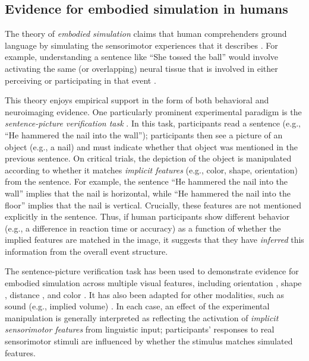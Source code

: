 \documentclass[11pt]{article}
\begin{document}
\subsection{Evidence for embodied simulation in humans}

The theory of \textit{embodied simulation} claims that human comprehenders ground language by simulating the sensorimotor experiences that it describes \cite{barsalou1999perceptual, harnad1990symbol}. For example, understanding a sentence like ``She tossed the ball'' would involve activating the same (or overlapping) neural tissue that is involved in either perceiving or participating in that event \cite{bergen2015embodiment}. 

This theory enjoys empirical support in the form of both behavioral \cite{zwaan2002language, pecher2009short, winter2012language, stanfield2001effect} and neuroimaging \cite{hauk2004somatotopic, pulvermuller2013neurons} evidence. One particularly prominent experimental paradigm is the \textit{sentence-picture verification task} \cite{stanfield2001effect, winter2012language, zwaan2002language, pecher2009short}. In this task, participants read a sentence (e.g., ``He hammered the nail into the wall''); participants then see a picture of an object (e.g., a nail) and must indicate whether that object was mentioned in the previous sentence. On critical trials, the depiction of the object is manipulated according to whether it matches \textit{implicit features} (e.g., color, shape, orientation) from the sentence. For example, the sentence ``He hammered the nail into the wall'' implies that the nail is horizontal, while ``He hammered the nail into the floor'' implies that the nail is vertical. Crucially, these features are not mentioned explicitly in the sentence. Thus, if human participants show different behavior (e.g., a difference in reaction time or accuracy) as a function of whether the implied features are matched in the image, it suggests that they have \textit{inferred} this information from the overall event structure.

The sentence-picture verification task has been used to demonstrate evidence for embodied simulation across multiple visual features, including orientation \cite{stanfield2001effect}, shape \cite{pecher2009short}, distance \cite{winter2012language}, and color \cite{connell2007representing, zwaan2012revisiting}. It has also been adapted for other modalities, such as sound (e.g., implied volume) \cite{winter2012language}. In each case, an effect of the experimental manipulation is generally interpreted as reflecting the activation of \textit{implicit sensorimotor features} from linguistic input; participants' responses to real sensorimotor stimuli are influenced by whether the stimulus matches simulated features.
\end{document}
